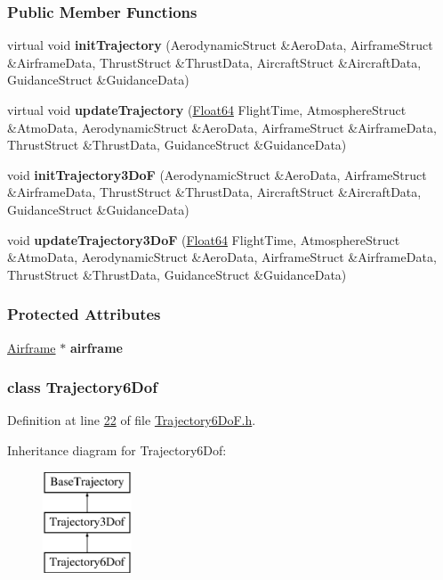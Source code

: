 \subsubsection*{Public Member Functions}
\begin{DoxyCompactItemize}
\item 
virtual void {\bfseries init\+Trajectory} (Aerodynamic\+Struct \&Aero\+Data, Airframe\+Struct \&Airframe\+Data, Thrust\+Struct \&Thrust\+Data, Aircraft\+Struct \&Aircraft\+Data, Guidance\+Struct \&Guidance\+Data)
\item 
virtual void {\bfseries update\+Trajectory} (\hyperlink{group___tools_ga3f1431cb9f76da10f59246d1d743dc2c}{Float64} Flight\+Time, Atmosphere\+Struct \&Atmo\+Data, Aerodynamic\+Struct \&Aero\+Data, Airframe\+Struct \&Airframe\+Data, Thrust\+Struct \&Thrust\+Data, Guidance\+Struct \&Guidance\+Data)
\item 
void {\bfseries init\+Trajectory3\+DoF} (Aerodynamic\+Struct \&Aero\+Data, Airframe\+Struct \&Airframe\+Data, Thrust\+Struct \&Thrust\+Data, Aircraft\+Struct \&Aircraft\+Data, Guidance\+Struct \&Guidance\+Data)
\item 
void {\bfseries update\+Trajectory3\+DoF} (\hyperlink{group___tools_ga3f1431cb9f76da10f59246d1d743dc2c}{Float64} Flight\+Time, Atmosphere\+Struct \&Atmo\+Data, Aerodynamic\+Struct \&Aero\+Data, Airframe\+Struct \&Airframe\+Data, Thrust\+Struct \&Thrust\+Data, Guidance\+Struct \&Guidance\+Data)
\end{DoxyCompactItemize}
\subsubsection*{Protected Attributes}
\begin{DoxyCompactItemize}
\item 
\hyperlink{group___airframe_class_airframe}{Airframe} $\ast$ {\bfseries airframe}
\end{DoxyCompactItemize}
\label{class_trajectory6_dof}
\subsubsection{class Trajectory6\+Dof}


Definition at line \hyperlink{_trajectory6_do_f_8h_source_l00022}{22} of file \hyperlink{_trajectory6_do_f_8h_source}{Trajectory6\+Do\+F.\+h}.

Inheritance diagram for Trajectory6\+Dof\+:\begin{figure}[H]
\begin{center}
\leavevmode
\includegraphics[height=3.000000cm]{group___trajectory}
\end{center}
\end{figure}

